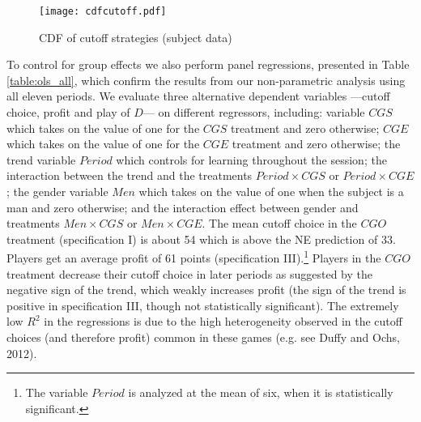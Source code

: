 \documentclass[11pt, letterpaper]{article}
\theoremstyle{plain}
\begin{document}
\begin{center}
\begin{figure}[ht]
\centering{}%
\texttt{[image: cdfcutoff.pdf]}%
\caption{CDF of cutoff strategies (subject data) \\ } 
\label{fig:allcutoff}
\end{figure}
\par\end{center}

To control for group effects we also perform panel regressions, presented in Table \ref{table:ols_all}, which confirm the results from our non-parametric analysis using all eleven periods. We evaluate three alternative dependent variables ---cutoff choice, profit and play of $D$---  on different regressors, including: variable $CGS$ which takes on the value of one for the $CGS$ treatment and zero otherwise; $CGE$ which takes on the value of one for the $CGE$ treatment and zero otherwise; the trend variable $Period$ which controls for learning throughout the session; the interaction between the trend and the treatments $Period \times CGS$ or $Period \times CGE$; the gender variable $Men$ which takes on the value of one when the subject is a man and zero otherwise; and the interaction effect between gender and treatments $Men \times CGS$ or $Men \times CGE$. The mean cutoff choice in the $CGO$ treatment (specification I) is about 54 which is above the NE prediction of 33. Players get an average profit of 61 points (specification III).\footnote{The variable $Period$ is analyzed at the mean of six, when it is statistically significant.} Players in the $CGO$ treatment decrease their cutoff choice in later periods as suggested by the negative sign of the trend, which weakly increases profit (the sign of the trend is positive in specification III, though not statistically significant). The extremely low $R^2$ in the regressions is due to the high heterogeneity observed in the cutoff choices (and therefore profit) common in these games (e.g. see Duffy and Ochs, 2012).\\
\end{document}
